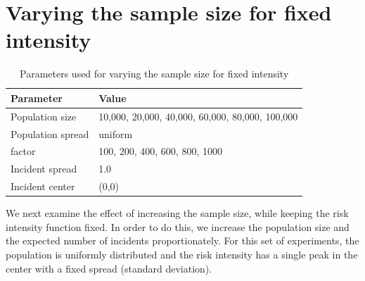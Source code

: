 \section{Varying the sample size for fixed intensity}
\label{sec:results:unifNpop_1h}

\begin{table}[htbp]
\centering
\begin{tabular}{ll}
\hline
Parameter & Value \\
\hline
Population size & 10,000, 20,000, 40,000, 60,000, 80,000, 100,000 \\
Population \gls{spread} & uniform \\
\Gls{factor} & 100, 200, 400, 600, 800, 1000 \\
Incident \gls{spread} & 1.0 \\
Incident center & (0,0) \\
\hline
\end{tabular}
\caption{Parameters used for varying the sample size for fixed intensity}
\label{tab:params:unifNpop_1h}
\end{table}


We next examine the effect of increasing the sample size, while keeping the risk intensity function fixed.
In order to do this, we increase the population size and the expected number of incidents proportionately.
For this set of experiments, the population is uniformly distributed and the risk intensity has a single peak in the center with a fixed \gls{spread} (standard deviation).

